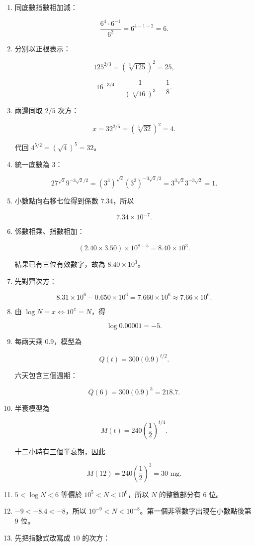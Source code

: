 \documentclass[11pt,a4paper]{article}
\begin{document}
\begin{enumerate}
\def\labelenumi{\arabic{enumi}.}
\item
  同底數指數相加減：

  \[
  \frac{6^4\cdot6^{-1}}{6^2}=6^{4-1-2}=\boxed6.
  \]
\item
  分別以正根表示：

  \[
  125^{2/3}=(\sqrt[3]{125})^2=25,
  \]

  \[
  16^{-3/4}=\frac1{(\sqrt[4]{16})^3}=\frac18.
  \]
\item
  兩邊同取 \(2/5\) 次方：

  \[
  x=32^{2/5}=(\sqrt[5]{32})^2=\boxed4.
  \]

  代回 \(4^{5/2}=(\sqrt{4})^5=32\)。
\item
  統一底數為 \(3\)：

  \[
  27^{\sqrt{2}}9^{-3\sqrt{2}/2}
  =(3^3)^{\sqrt{2}}(3^2)^{-3\sqrt{2}/2}
  =3^{3\sqrt{2}}3^{-3\sqrt{2}}=\boxed1.
  \]
\item
  小數點向右移七位得到係數 \(7.34\)，所以

  \[
  \boxed{7.34\times10^{-7}}.
  \]
\item
  係數相乘、指數相加：

  \[
  (2.40\times3.50)\times10^{8-5}
  =8.40\times10^3.
  \]

  結果已有三位有效數字，故為 \(\boxed{8.40\times10^3}\)。
\item
  先對齊次方：

  \[
  8.31\times10^6-0.650\times10^6
  =7.660\times10^6
  \approx\boxed{7.66\times10^6}.
  \]
\item
  由 \(\log N=x\iff10^x=N\)，得

  \[
  \boxed{\log0.00001=-5}.
  \]
\item
  每兩天乘 \(0.9\)，模型為

  \[
  Q(t)=300(0.9)^{t/2}.
  \]

  六天包含三個週期：

  \[
  Q(6)=300(0.9)^3=\boxed{218.7}.
  \]
\item
  半衰模型為

  \[
  M(t)=240\left(\frac12\right)^{t/4}.
  \]

  十二小時有三個半衰期，因此

  \[
  M(12)=240\left(\frac12\right)^3=\boxed{30\text{ mg}}.
  \]
\item
  \(5<\log N<6\) 等價於 \(10^5<N<10^6\)，所以 \(N\) 的整數部分有 \(\boxed6\) 位。
\item
  \(-9<-8.4<-8\)，所以 \(10^{-9}<N<10^{-8}\)。第一個非零數字出現在小數點後第 \(\boxed9\) 位。
\item
  先把指數式改寫成 \(10\) 的次方：


\end{enumerate}
\end{document}
